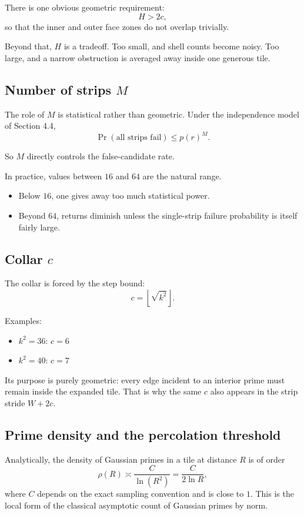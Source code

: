 \documentclass[12pt,letterpaper]{article}
\theoremstyle{definition}
\theoremstyle{remark}
\begin{document}
There is one obvious geometric requirement:
\[
H>2c,
\]
so that the inner and outer face zones do not overlap trivially.

Beyond that, $H$ is a tradeoff. Too small, and shell counts become noisy. Too large, and a narrow obstruction is averaged away inside one generous tile.

\subsection{Number of strips \texorpdfstring{$M$}{M}}

The role of $M$ is statistical rather than geometric. Under the independence model of Section 4.4,
\[
\Pr(\text{all strips fail}) \le p(r)^M.
\]

So $M$ directly controls the false-candidate rate.

In practice, values between $16$ and $64$ are the natural range.

\begin{itemize}
\item Below $16$, one gives away too much statistical power.
\item Beyond $64$, returns diminish unless the single-strip failure probability is itself fairly large.
\end{itemize}

\subsection{Collar \texorpdfstring{$c$}{c}}

The collar is forced by the step bound:
\[
c=\left\lfloor\sqrt{k^2}\right\rfloor.
\]

Examples:

\begin{itemize}
\item $k^2=36$: $c=6$
\item $k^2=40$: $c=7$
\end{itemize}

Its purpose is purely geometric: every edge incident to an interior prime must remain inside the expanded tile. That is why the same $c$ also appears in the strip stride $W+2c$.

\subsection{Prime density and the percolation threshold}

Analytically, the density of Gaussian primes in a tile at distance $R$ is of order
\[
\rho(R)\asymp \frac{C}{\ln(R^2)}=\frac{C}{2\ln R},
\]
where $C$ depends on the exact sampling convention and is close to $1$. This is the local form of the classical asymptotic count of Gaussian primes by norm.
\end{document}
